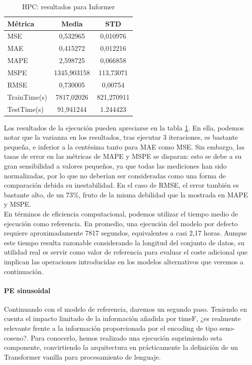 \begin{table}[!ht]
	\centering
\begin{tabular}{l|c|c}
	\toprule
	Métrica & Media & STD \\
	\midrule
	MSE & 0,532965 & 0,010976 \\
	MAE & 0,415272 & 0,012216 \\
	MAPE & 2,598725 & 0,066858 \\
	MSPE & 1345,903158 & 113,73071 \\
	RMSE & 0,730005 & 0,00754 \\
	TrainTime(s) & 7817,02026 & 821,270911 \\
	TestTime(s) & 91,941244 & 1.244423 \\
	\bottomrule
\end{tabular}
\caption{HPC: resultados para Informer}
\label{hpcinf}
\end{table}

Los resultados de la ejecución pueden apreciarse en la tabla \ref{hpcinf}. En ella, podemos notar que la varianza en los resultados, tras ejecutar 3 iteraciones, es bastante pequeña, e inferior a la centésima tanto para MAE como MSE. Sin embargo, las tasas de error en las métricas de MAPE y MSPE se disparan: esto se debe a su gran sensibilidad a valores pequeños, ya que todas las mediciones han sido normalizadas, por lo que no deberían ser consideradas como una forma de comparación debida su inestabilidad. En el caso de RMSE, el error también es bastante alto, de un 73\%, fruto de la misma debilidad que la mostrada en MAPE y MSPE.\\

En términos de eficiencia computacional, podemos utilizar el tiempo medio de ejecución como referencia. En promedio, una ejecución del modelo por defecto requiere aproximadamente 7817 segundos, equivalentes a casi 2,17 horas. Aunque este tiempo resulta razonable considerando la longitud del conjunto de datos, su utilidad real es servir como valor de referencia para evaluar el coste adicional que implican las operaciones introducidas en los modelos alternativos que veremos a continuación.

\paragraph{PE sinusoidal}

Continuando con el modelo de referencia, daremos un segundo paso. Teniendo en cuenta el impacto limitado de la información añadida por timeF, ¿es realmente relevante frente a la información proporcionada por el encoding de tipo seno-coseno?. Para conocerlo, hemos realizado una ejecución suprimiendo esta componente, convirtiendo la arquitectura en prácticamente la definición de un Transformer vanilla para procesamiento de lenguaje.\\

